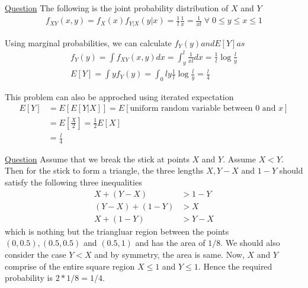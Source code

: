 \documentclass[../probability-notes.tex]{subfiles}
\begin{document}
\begin{enumerate}
        \hypertarget{a_breakstick}{\item} \hyperlink{q_breakstick}{Question}\newline
        The following is the joint probability distribution of $X$ and $Y$
        \begin{align*}
            f_{XY}(x, y) = f_{X}(x) f_{Y|X}(y|x) = \frac{1}{l} \frac{1}{x} = \frac{1}{xl} \;\forall\; 0 \leq y \leq x \leq 1
        \end{align*}
        
        Using marginal probabilities, we can calculate $f_{Y}(y) and E[Y] as$
        \begin{align*}
            f_{Y}(y) = \int f_{XY}(x,y) dx = \int_{y}^{l} \frac{1}{xl} dx = \frac{1}{l} \log \frac{l}{y} \tag*{Note that for any $y$, $y \leq x \leq l$}\\
            E[Y] = \int y f_{Y}(y) = \int_{0}{l} y \frac{1}{l} \log\frac{l}{y} = \frac{l}{4}
        \end{align*}

        This problem can also be approched using iterated expectation
        \begin{align*}
            E[Y] &= E[E[Y|X]] = E[\text{uniform random variable between $0$ and $x$}]\\
                &= E[\frac{X}{2}] =\frac{1}{2}E[X]\\
                &= \frac{l}{4} 
        \end{align*}

        \hypertarget{a_trianglestick}{\item} \hyperlink{q_trianglestick}{Question}\newline
        Assume that we break the stick at points $X$ and $Y$. Assume $X < Y$. Then for the stick to form a triangle, the three lengths $X, Y-X$ and $1-Y$ should satisfy the following three inequalities
        \begin{align*}
            X+(Y-X) &> 1-Y\\
            (Y-X) + (1-Y) &> X\\
            X + (1-Y) &> Y-X
        \end{align*}
        which is nothing but the triangluar region between the points $(0, 0.5), (0.5, 0.5)$ and $(0.5, 1)$ and has the area of $1/8$. We should also consider the case $Y < X$ and by symmetry, the area is same. Now, $X$ and $Y$ comprise of the entire square region $X \leq 1$ and $Y \leq 1$. Hence the required probability is $2 * 1/8 = 1/4$.


\end{enumerate}
\end{document}
